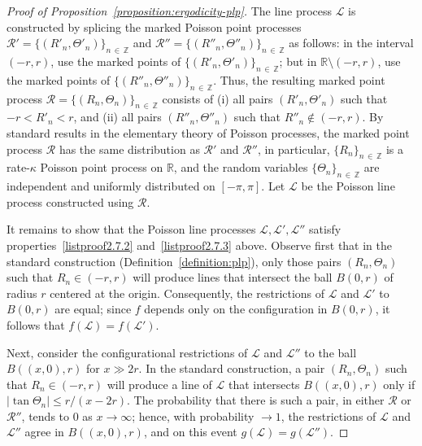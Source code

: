 \documentclass[10pt]{amsart}
\theoremstyle{definition}\newtheorem{defi}[theo]{Definition}\newtheorem{rema}[theo]{Remark}\newtheorem{exam}[theo]{Example}\newtheorem{exem}[theo]{Example}\newtheorem{nota}[theo]{Notation}
\newcommand{\zz}[1]{\mathbb #1}
\begin{document}
\begin{proof}[Proof of Proposition~\ref{proposition:ergodicity-plp}]
The line process $\mathcal{L}$ is constructed by splicing the marked Poisson point processes $\mathcal{R}'=\{(R'_{n},\Theta'_{n})\}_{n\,\in\,\zz{Z}}$ and $\mathcal{R}''=\{(R''_{n},\Theta''_{n}) \}_{n\,\in\,\zz{Z}}$ as follows: in the interval $(-r,r)$, use the marked points of $\{(R'_{n},\Theta'_{n})\}_{n\,\in\,\zz{Z}}$; but in $\zz{R}\setminus (-r,r)$, use the marked points of $\{(R''_{n},\Theta''_{n}) \}_{n\,\in\,\zz{Z}}$. Thus, the resulting marked point process $\mathcal{R}=\{(R_{n},\Theta_{n}) \}_{n\,\in\,\zz{Z}}$ consists of (i) all pairs $(R'_{n},\Theta '_{n})$ such that $-r<R'_{n}<r$, and (ii) all pairs $(R''_{n},\Theta ''_{n})$ such that $R''_{n}\not \in (-r,r)$. By standard results in the elementary theory of Poisson processes, the marked point process $\mathcal{R}$ has the same distribution as $\mathcal{R}'$ and $\mathcal{R}''$, in particular, $\{R_{n} \}_{n\,\in\, \zz{Z}}$ is a rate-$\kappa$ Poisson point process on $\zz{R}$, and the random variables $\{\Theta_{n} \}_{n\,\in\, \zz{Z}}$ are independent and uniformly distributed on $[-\pi,\pi]$. Let $\mathcal{L}$ be the Poisson line process constructed using $\mathcal{R}$.


It remains to show that the Poisson line processes $\mathcal{L},\mathcal{L}',\mathcal{L}''$ satisfy properties~\eqref{listproof2.7.2} and~\eqref{listproof2.7.3} above. Observe first that in the standard construction (Definition~\ref{definition:plp}), only those pairs $(R_{n},\Theta_{n})$ such that $R_{n}\in (-r,r)$ will produce lines that intersect the ball $B (0,r)$ of radius $r$ centered at the origin. Consequently, the restrictions of $\mathcal{L}$ and $\mathcal{L}'$ to $B (0,r)$ are equal; since $f$ depends only on the configuration in $B (0,r)$, it follows that $f (\mathcal{L})=f (\mathcal{L}')$.

Next, consider the configurational restrictions of $\mathcal{L}$ and $\mathcal{L}''$ to the ball $B ((x,0),r)$ for $x\gg 2r$. In the standard construction, a pair $(R_{n},\Theta_{n})$ such that $R_{n}\in (-r,r)$ will produce a line of $\mathcal{L}$ that intersects $B((x,0),r)$ only if $|\tan \Theta_{n}|\leq r/ (x-2r)$. The probability that there is such a pair, in either $\mathcal{R}$ or $\mathcal{R}''$, tends to $0$ as $x \rightarrow \infty$; hence, with probability $\rightarrow 1$, the restrictions of $\mathcal{L}$ and $\mathcal{L}''$ agree in $B ((x,0),r)$, and on this event $g (\mathcal{L})=g (\mathcal{L}'')$.
\end{proof}
\end{document}
